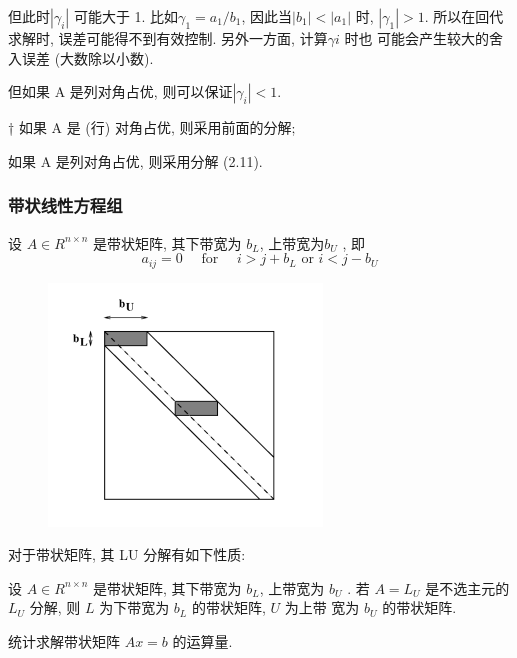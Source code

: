 \documentclass[12pt,a4paper]{article}
\begin{document}
但此时$ |\gamma_i|$ 可能大于 1. 比如$ \gamma_1 = a_1/b_1$, 因此当$|b_1| < |a_1|$ 时, $|\gamma_1| > 1$.
所以在回代求解时, 误差可能得不到有效控制. 另外一方面, 计算$ γi$ 时也
可能会产生较大的舍入误差 (大数除以小数).

但如果 A 是列对角占优, 则可以保证$ |\gamma_i| < 1.$


† 如果 A 是 (行) 对角占优, 则采用前面的分解;

如果 A 是列对角占优, 则采用分解 (2.11).


\subsubsection{带状线性方程组}
设 $A ∈ R^{n×n}$ 是带状矩阵, 其下带宽为 $b_L$, 上带宽为$b_U$ , 即
\begin{equation}
a_{i j}=0 \quad \text { for } \quad i>j+b_{L} \text { or } i<j-b_{U}
\end{equation}

\begin{figure}[h]%
	\centering  %
	\includegraphics[width=0.7\linewidth]{figures/Figure_7.png}  %
	\caption{}  %
	\label{fig:mcmthesis-logo}   %
\end{figure}

对于带状矩阵, 其 LU 分解有如下性质:

\begin{theorem}
	设 $A ∈ R^{n×n}$ 是带状矩阵, 其下带宽为 $b_L$, 上带宽为 $b_U$ . 若 $A =
	L_U$ 是不选主元的 $L_U$ 分解, 则 $L$ 为下带宽为 $b_L$ 的带状矩阵, $U$ 为上带
	宽为 $b_U$ 的带状矩阵.	
\end{theorem}


统计求解带状矩阵 $Ax = b$ 的运算量.
\end{document}
